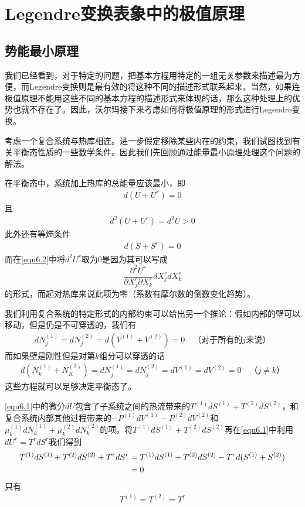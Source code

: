 \chapter{Legendre变换表象中的极值原理}
\label{chap6}

\section{势能最小原理}\label{sec6.1}

我们已经看到，对于特定的问题，把基本方程用特定的一组无关参数来描述最为方便，而Legendre变换则是最有效的将这种不同的描述形式联系起来。当然，如果连极值原理不能用这些不同的基本方程的描述形式来体现的话，那么这种处理上的优势也就不存在了。因此，沃尔玛接下来考虑如何将极值原理的形式进行Legendre变换。

考虑一个复合系统与热库相连。进一步假定移除某些内在的约束，我们试图找到有关平衡态性质的一些数学条件。因此我们先回顾通过能量最小原理处理这个问题的解法。

在平衡态中，系统加上热库的总能量应该最小，即
\begin{align}\label{equ6.1}
d(U+U^r)=0
\end{align}
且
\begin{align}\label{equ6.2}
d^2(U+U^r)=d^2U>0
\end{align}
此外还有等熵条件
\begin{align}\label{equ6.3}
d(S+S^r)=0
\end{align}
而在\eqref{equ6.2}中将$d^2U^r$取为0是因为其可以写成
\[\frac{\partial^2 U^r}{\partial X_j^r\partial X_k^r}dX_j^rdX_k^r \]
的形式，而起对热库来说此项为零（系数有摩尔数的倒数变化趋势）。

我们利用复合系统的特定形式的内部约束可以给出另一个推论：假如内部的壁可以移动，但是仍是不可穿透的，我们有
\begin{align}\label{equ6.4}
dN_j^{(1)}=dN_j^{(2)}=d(V^{(1)}+V^{(2)})=0 \quad\text{（对于所有的$j$来说）}
\end{align}
而如果壁是刚性但是对第$k$组分可以穿透的话
\begin{align}\label{equ6.5}
d(N_k^{(1)}+N_K^{(2)})=dN_j^{(1)}=dN_j^{(2)}=dV^{(1)}=dV^{(2)}=0 \quad\text{（$j\neq k$）}
\end{align}
这些方程就可以足够决定平衡态了。

\eqref{equ6.1}中的微分$dU$包含了子系统之间的热流带来的$T^{(1)}dS^{(1)}+T^{(2)}dS^{(2)}$，和复合系统内部其他过程带来的$-P^{(1)}dV^{(1)}-P^{(2)}dV^{(2)}$和$\mu_k^{(1)}dN_k^{(1)}+\mu_k^{(2)}dN_k^{(2)}$的项。将$T^{(1)}dS^{(1)}+T^{(2)}dS^{(2)}$再在\eqref{equ6.1}中利用$dU^r=T^rdS^r$我们得到
\begin{align}\notag{}
T^{(1)}dS^{(1)}+T^{(2)}dS^{(2)}+T^rdS^r&=T^{(1)}dS^{(1)}+T^{(2)}dS^{(2)}-T^rd(S^{(1)}+S^{(2)})\\
&=0\label{equ6.6}
\end{align}
只有
\begin{align}\label{equ6.7}
T^{(1)}=T^{(2)}=T^r
\end{align}

